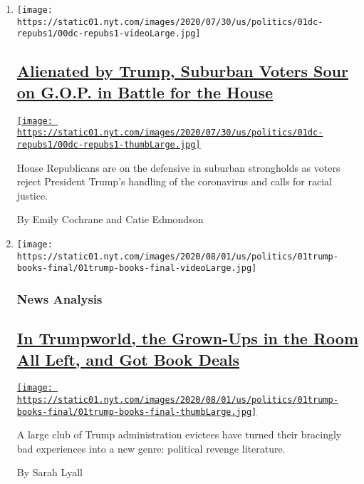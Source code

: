 \begin{enumerate}
\def\labelenumi{\arabic{enumi}.}
\item
  \texttt{[image: https://static01.nyt.com/images/2020/07/30/us/politics/01dc-repubs1/00dc-repubs1-videoLarge.jpg]}

  \hypertarget{alienated-by-trump-suburban-voters-sour-on-gop-in-battle-for-the-house}{%
  \subsection{\texorpdfstring{\href{/2020/08/01/us/politics/trump-suburban-voters-republicans-house.html}{Alienated
  by Trump, Suburban Voters Sour on G.O.P. in Battle for the
  House}}{Alienated by Trump, Suburban Voters Sour on G.O.P. in Battle for the House}}\label{alienated-by-trump-suburban-voters-sour-on-gop-in-battle-for-the-house}}

  \href{/2020/08/01/us/politics/trump-suburban-voters-republicans-house.html}{\texttt{[image: https://static01.nyt.com/images/2020/07/30/us/politics/01dc-repubs1/00dc-repubs1-thumbLarge.jpg]}}

  House Republicans are on the defensive in suburban strongholds as
  voters reject President Trump's handling of the coronavirus and calls
  for racial justice.

  By Emily Cochrane and Catie Edmondson
\item
  \texttt{[image: https://static01.nyt.com/images/2020/08/01/us/politics/01trump-books-final/01trump-books-final-videoLarge.jpg]}

  \hypertarget{news-analysis}{%
  \subsubsection{News Analysis}\label{news-analysis}}

  \hypertarget{in-trumpworld-the-grown-ups-in-the-room-all-left-and-got-book-deals}{%
  \subsection{\texorpdfstring{\href{/2020/08/01/us/politics/trump-books.html}{In
  Trumpworld, the Grown-Ups in the Room All Left, and Got Book
  Deals}}{In Trumpworld, the Grown-Ups in the Room All Left, and Got Book Deals}}\label{in-trumpworld-the-grown-ups-in-the-room-all-left-and-got-book-deals}}

  \href{/2020/08/01/us/politics/trump-books.html}{\texttt{[image: https://static01.nyt.com/images/2020/08/01/us/politics/01trump-books-final/01trump-books-final-thumbLarge.jpg]}}

  A large club of Trump administration evictees have turned their
  bracingly bad experiences into a new genre: political revenge
  literature.

  By Sarah Lyall
\end{enumerate}

